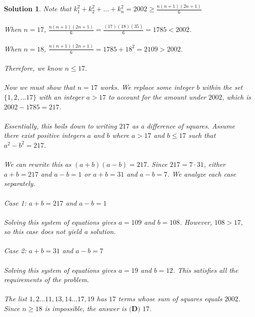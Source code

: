 \documentclass[12pt]{article}
\newtheorem*{solution*}{Solution}
\begin{document}
\begin{solution*}
Note that $k^2_1 + k^2_2 + ... + k^2_n = 2002 \geq \frac{n(n+1)(2n+1)}{6}$
\\ \\
When $n = 17$, $\frac{n(n+1)(2n+1)}{6} = \frac{(17)(18)(35)}{6} = 1785 < 2002$.
\\ \\
When $n = 18$, $\frac{n(n+1)(2n+1)}{6} = 1785 + 18^2 = 2109 > 2002$.
\\ \\
Therefore, we know $n \leq 17$.
\\ \\
Now we must show that $n = 17$ works. We replace some integer $b$ within the set $\{1, 2, ... 17\}$ with an integer $a > 17$ to account for the amount under $2002$, which is $2002-1785 = 217$.
\\ \\
Essentially, this boils down to writing $217$ as a difference of squares. Assume there exist positive integers $a$ and $b$ where $a > 17$ and $b \leq 17$ such that $a^2 - b^2 = 217$.
\\ \\
We can rewrite this as $(a+b)(a-b) = 217$. Since $217 = 7 \cdot 31$, either $a+b = 217$ and $a-b = 1$ or $a+b = 31$ and $a-b = 7$. We analyze each case separately.
\\ \\
Case 1: $a+b = 217$ and $a-b = 1$
\\ \\
Solving this system of equations gives $a = 109$ and $b = 108$. However, $108 > 17$, so this case does not yield a solution.
\\ \\
Case 2: $a+b = 31$ and $a-b = 7$
\\ \\
Solving this system of equations gives $a = 19$ and $b = 12$. This satisfies all the requirements of the problem.
\\ \\
The list $1, 2 ... 11, 13, 14 ... 17, 19$ has $17$ terms whose sum of squares equals $2002$. Since $n \geq 18$ is impossible, the answer is $\boxed {\textbf{(D) }17}$.
\end{solution*}
\end{document}
